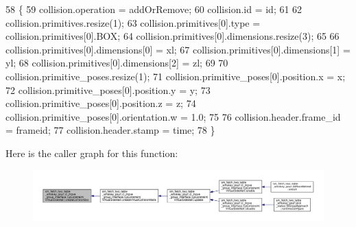 \begin{DoxyCode}
58         \{
59             collision.operation = addOrRemove;
60             collision.id = id;
61 
62             collision.primitives.resize(1);
63             collision.primitives[0].type = collision.primitives[0].BOX;
64             collision.primitives[0].dimensions.resize(3);
65 
66             collision.primitives[0].dimensions[0] = xl;
67             collision.primitives[0].dimensions[1] = yl;
68             collision.primitives[0].dimensions[2] = zl;
69 
70             collision.primitive\_poses.resize(1);
71             collision.primitive\_poses[0].position.x = x;
72             collision.primitive\_poses[0].position.y = y;
73             collision.primitive\_poses[0].position.z = z;
74             collision.primitive\_poses[0].orientation.w = 1.0;
75 
76             collision.header.frame\_id = frameid;
77             collision.header.stamp = time;
78         \}
\end{DoxyCode}
Here is the caller graph for this function\+:
\nopagebreak
\begin{figure}[H]
\begin{center}
\leavevmode
\includegraphics[width=350pt]{classsm__fetch__two__table__whiskey__pour_1_1cl__move__group__interface_1_1CpConstraintVirtualSideWall_ae495cc19dbaacf4cc7f4df803193ae92_icgraph}
\end{center}
\end{figure}
\mbox{\label{classsm__fetch__two__table__whiskey__pour_1_1cl__move__group__interface_1_1CpConstraintVirtualSideWall_ad4ecafb1a6c5cc8f72f04643047c0b03}} 
